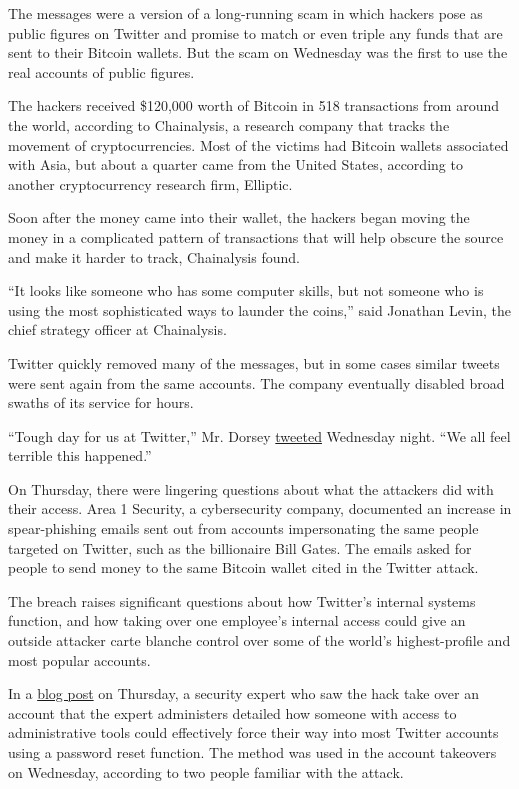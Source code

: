 The messages were a version of a long-running scam in which hackers pose
as public figures on Twitter and promise to match or even triple any
funds that are sent to their Bitcoin wallets. But the scam on Wednesday
was the first to use the real accounts of public figures.

The hackers received \$120,000 worth of Bitcoin in 518 transactions from
around the world, according to Chainalysis, a research company that
tracks the movement of cryptocurrencies. Most of the victims had Bitcoin
wallets associated with Asia, but about a quarter came from the United
States, according to another cryptocurrency research firm, Elliptic.

Soon after the money came into their wallet, the hackers began moving
the money in a complicated pattern of transactions that will help
obscure the source and make it harder to track, Chainalysis found.

``It looks like someone who has some computer skills, but not someone
who is using the most sophisticated ways to launder the coins,'' said
Jonathan Levin, the chief strategy officer at Chainalysis.

Twitter quickly removed many of the messages, but in some cases similar
tweets were sent again from the same accounts. The company eventually
disabled broad swaths of its service for hours.

``Tough day for us at Twitter,'' Mr. Dorsey
\href{https://twitter.com/jack/status/1283571658339397632}{tweeted}
Wednesday night. ``We all feel terrible this happened.''

On Thursday, there were lingering questions about what the attackers did
with their access. Area 1 Security, a cybersecurity company, documented
an increase in spear-phishing emails sent out from accounts
impersonating the same people targeted on Twitter, such as the
billionaire Bill Gates. The emails asked for people to send money to the
same Bitcoin wallet cited in the Twitter attack.

The breach raises significant questions about how Twitter's internal
systems function, and how taking over one employee's internal access
could give an outside attacker carte blanche control over some of the
world's highest-profile and most popular accounts.

In a
\href{https://medium.com/@lucky225/the-twitter-hack-what-exactly-happened-d8740d33c1c}{blog
post} on Thursday, a security expert who saw the hack take over an
account that the expert administers detailed how someone with access to
administrative tools could effectively force their way into most Twitter
accounts using a password reset function. The method was used in the
account takeovers on Wednesday, according to two people familiar with
the attack.

